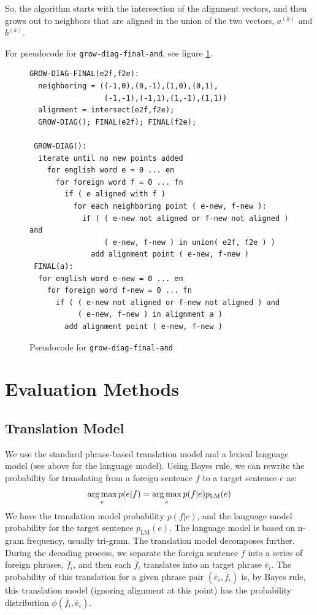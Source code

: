 \documentclass[twocolumn]{article}
\newcommand{\originalAlign}{\texttt{grow-diag-final-and}}
\begin{document}
So, the algorithm starts with the intersection of the alignment vectors, and
then grows out to neighbors that are aligned in the union of the two vectors,
$a^{(k)}$ and $b^{(k)}$.

For pseudocode for \originalAlign{}, see figure \ref{fig:growDiagPseudo}.

\begin{figure}[t]
\begin{Verbatim}[frame=single]
GROW-DIAG-FINAL(e2f,f2e):
  neighboring = ((-1,0),(0,-1),(1,0),(0,1),
                 (-1,-1),(-1,1),(1,-1),(1,1))
  alignment = intersect(e2f,f2e);
  GROW-DIAG(); FINAL(e2f); FINAL(f2e);

 GROW-DIAG():
  iterate until no new points added
    for english word e = 0 ... en
      for foreign word f = 0 ... fn
        if ( e aligned with f )
          for each neighboring point ( e-new, f-new ):
            if ( ( e-new not aligned or f-new not aligned ) and
                 ( e-new, f-new ) in union( e2f, f2e ) )
              add alignment point ( e-new, f-new )
 FINAL(a):
  for english word e-new = 0 ... en
    for foreign word f-new = 0 ... fn
      if ( ( e-new not aligned or f-new not aligned ) and
           ( e-new, f-new ) in alignment a )
        add alignment point ( e-new, f-new )
\end{Verbatim}
\caption{Pseudocode for \originalAlign{}}
\label{fig:growDiagPseudo}
\end{figure}



\section{Evaluation Methods}
\subsection{Translation Model}
We use the standard phrase-based translation model and a lexical language
model (see above for the language model).
Using Bayes rule, we can rewrite the probability for translating from a
foreign sentence $f$ to a target sentence $e$ as:
\[
  \operatorname*{arg\,max}_e p(e|f) = \operatorname*{arg\,max}_e p(f|e) p_{\text{LM}}(e)
\]
We have the translation model probability $p(f|e)$, and the language model
probability for the target sentence $p_{\text{LM}}(e)$.
The language model is based on n-gram frequency, usually tri-gram.
The translation model decomposes further. During the decoding
process, we separate the foreign sentence $f$ into a series of foreign phrases,
$\overline{f}_i$, and then each $\overline{f}_i$ translates into an target
phrase $\overline{e}_i$. The probability of this translation for a given phrase
pair $(\overline{e}_i, \overline{f}_i)$ is, by Bayes rule, this translation
model (ignoring alignment at this point) has the probability distribution
$\phi(\overline{f}_i, \overline{e}_i)$.
\end{document}

